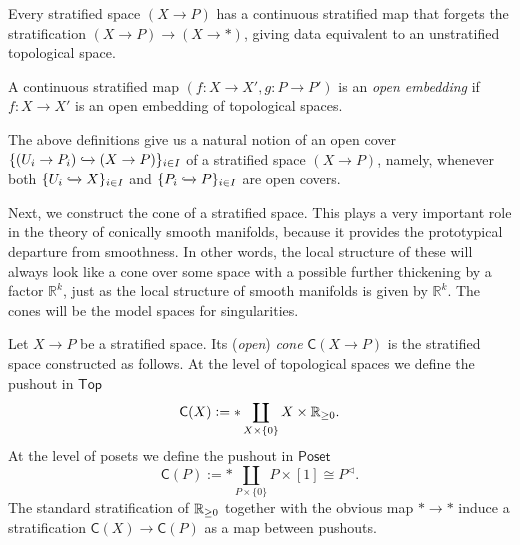 \documentclass[../text]{subfiles}
\begin{document}
\begin{example}\label{ex:forget_strat}
    Every stratified space $(X \rightarrow P)$ has a continuous stratified map that forgets the stratification $(X \rightarrow P) \rightarrow (X \rightarrow *)$, giving data equivalent to an unstratified topological space. 
\end{example}

\begin{definition}
    A continuous stratified map $(f: X \rightarrow X', g: P \rightarrow P')$ is an \emph{open embedding} if $f: X \rightarrow X'$ is an open embedding of topological spaces.
\end{definition}

\begin{remark}
    The above definitions give us a natural notion of an open cover $\{ (U_i \rightarrow P_i) \xhookrightarrow{} (X \rightarrow P)\}_{i \in I}$ of a stratified space $(X \rightarrow P)$, namely, whenever both $\{ U_i \xhookrightarrow{} X\}_{i \in I}$ and $\{ P_i \xhookrightarrow{} P \}_{i \in I}$ are open covers.
\end{remark}

Next, we construct the cone of a stratified space. This plays a very important role in the theory of conically smooth manifolds, because it provides the prototypical departure from smoothness. In other words, the local structure of these will always look like a cone over some space with a possible further thickening by a factor $\mathbb{R}^k$, just as the local structure of smooth manifolds is given by $\mathbb{R}^k$. The cones will be the model spaces for singularities.

\begin{definition}
    Let $X \rightarrow P$ be a stratified space. Its (\emph{open}) \emph{cone} $\mathsf{C}(X \rightarrow P)$ is the stratified space constructed as follows. At the level of topological spaces we define the pushout in $\mathsf{Top}$
    \begin{equation}
        \mathsf{C}(X) := * \coprod_{X \times \{0\}} X \times \mathbb{R}_{\geq 0}.
    \end{equation}
    At the level of posets we define the pushout in $\mathsf{Poset}$
    \begin{equation}
        \mathsf{C}(P) := * \coprod_{P \times \{ 0\}} P \times [1] \cong P^{\vartriangleleft}.
    \end{equation}
    The standard stratification of $\mathbb{R}_{\geq 0}$ together with the obvious map $* \rightarrow *$ induce a stratification $\mathsf{C}(X) \rightarrow \mathsf{C}(P)$ as a map between pushouts. 
\end{definition}
\end{document}
